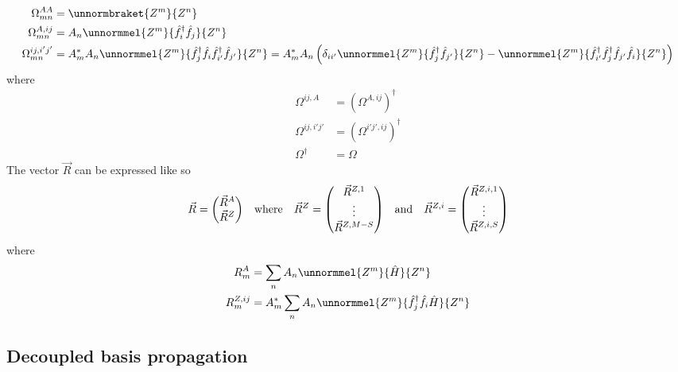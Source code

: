 \documentclass[12pt]{article}
\newcommand{\hc}{^\dagger}
\begin{document}
	\begin{align}
	\Omega^{AA}_{mn} &= \unnormbraket{Z^m}{Z^n}\\
	\Omega^{A,ij}_{mn} &= A_n\unnormmel{Z^m}{\hat{f}_i\hc\hat{f}_j}{Z^n}\\
	\Omega^{ij,i'j'}_{mn} &= A_m^* A_n \unnormmel{Z^m}{\hat{f}_j\hc\hat{f}_i\hat{f}_{i'}\hc\hat{f}_{j'}}{Z^n} = A_m^* A_n \left(\delta_{ii'} \unnormmel{Z^m}{\hat{f}_j\hc\hat{f}_{j'}}{Z^n} - \unnormmel{Z^m}{\hat{f}_{i'}\hc\hat{f}_j\hc\hat{f}_{j'}\hat{f}_{i}}{Z^n} \right)
	\end{align}
	where
	\begin{align}
	\Omega^{ij,A}&=(\Omega^{A,ij})\hc\\
	\Omega^{ij,i'j'}&=(\Omega^{i'j',ij})\hc\\
	\Omega\hc&=\Omega
	\end{align}
	The vector $\vec{R}$ can be expressed like so
	\begin{equation}
	\vec{R}=\mqty(\vec{R}^A \\ \vec{R}^Z)\qq{where} \vec{R}^Z = \mqty(\vec{R}^{Z,1} \\ \vdots \\ \vec{R}^{Z,M-S})\qq{and} \vec{R}^{Z,i} = \mqty(\vec{R}^{Z,i,1} \\ \vdots \\ \vec{R}^{Z,i,S})
	\end{equation}
	where
	\begin{align}
	R^A_m &= \sum_n A_n \unnormmel{Z^m}{\hat{H}}{Z^n}\\
	R^{Z,ij}_m &= A_m^* \sum_n A_n \unnormmel{Z^m}{\hat{f}\hc_j \hat{f}_i\hat{H}}{Z^n}
	\end{align}
	
	\subsection{Decoupled basis propagation} \label{sec: decoupled basis}
	
	\appendix
	
\end{document}
